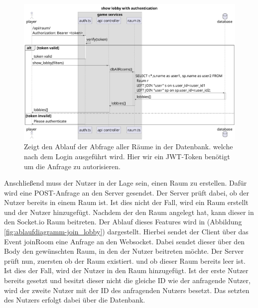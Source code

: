 \documentclass[
]{article}
\begin{document}
\begin{figure}[H]
	\centering
	\includegraphics[width=\textwidth ]{resources/show_lobby.pdf}
	\caption{Zeigt den Ablauf der Abfrage aller Räume in der Datenbank. welche nach dem Login ausgeführt wird. Hier wir ein JWT-Token benötigt um die Anfrage zu autorisieren.}
	\label{fig:ablaufdiagramm-show_lobby}
\end{figure}

Anschließend muss der Nutzer in der Lage sein, einen Raum zu erstellen. Dafür wird eine POST-Anfrage an den Server gesendet.
Der Server prüft dabei, ob der Nutzer bereits in einem Raum ist. Ist dies nicht der Fall, wird ein Raum erstellt und der Nutzer hinzugefügt.
Nachdem der den Raum angelegt hat, kann dieser in den Socket.io Raum beitreten.
Der Ablauf dieses Features wird in (Abbildung \ref{fig:ablaufdiagramm-join_lobby}) dargestellt.
Hierbei sendet der Client über das Event joinRoom eine Anfrage an den Websocket. Dabei sendet dieser über den
Body den gewünschten Raum, in den der Nutzer beitreten möchte. Der Server prüft nun, zuersten ob der Raum existiert.
und ob dieser Raum bereits leer ist. Ist dies der Fall, wird der Nutzer in den Raum hinzugefügt. 
Ist der erste Nutzer bereits gesetzt und besitzt dieser nicht die gleiche ID wie der anfragende Nutzer,
wird der zweite Nutzer mit der ID des anfragenden Nutzers besetzt.
Das setzten des Nutzers erfolgt dabei über die Datenbank.
\end{document}
